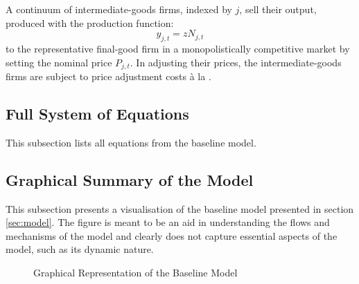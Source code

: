 \documentclass[a4paper,12pt]{article} %
\numberwithin{equation}{section} %
\numberwithin{figure}{section}
\numberwithin{table}{section}
\begin{document}
\begin{refsection}
\begin{appendices}
A continuum of intermediate-goods firms, indexed by $j$, sell their output, produced with the production function:
\begin{equation}
    y_{j,t} = z N_{j,t}
\end{equation}
to the representative final-good firm in a monopolistically competitive market by setting the nominal price $P_{j,t}$. In adjusting their prices, the intermediate-goods firms are subject to price adjustment costs à la \textcite{rotemberg1982}.

\subsection{Full System of Equations}
\label{sec-app:full-equations}

This subsection lists all equations from the baseline model.

\subsection{Graphical Summary of the Model}
\label{sec-app:full-graphical}

This subsection presents a visualisation of the baseline model presented in section \ref{sec:model}. The figure is meant to be an aid in understanding the flows and mechanisms of the model and clearly does not capture essential aspects of the model, such as its dynamic nature.

\begin{figure}[H]
\centering
\caption{Graphical Representation of the Baseline Model}
\label{fig:graphical-model}
\end{figure}
\end{appendices}
\end{refsection}
\end{document}
